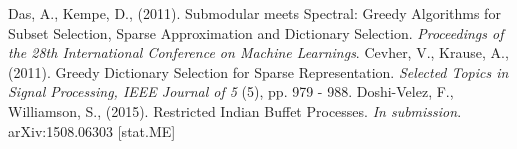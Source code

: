 \documentclass{article}
\begin{document}
\begin{thebibliography}{99}
  Das, A., Kempe, D., (2011). Submodular meets Spectral: Greedy Algorithms for Subset Selection, Sparse Approximation and Dictionary Selection. \textit{Proceedings of the 28th International Conference on Machine Learnings}.
  Cevher, V., Krause, A., (2011). Greedy Dictionary Selection for Sparse Representation. \textit{Selected Topics in Signal Processing, IEEE Journal of 5} (5), pp. 979 - 988.
  Doshi-Velez, F., Williamson, S., (2015). Restricted Indian Buffet Processes. \textit{In submission}. arXiv:1508.06303 [stat.ME]
  
\end{thebibliography}
\end{document}
